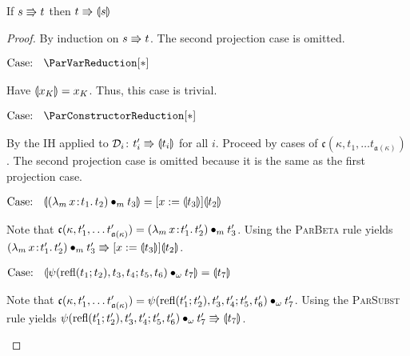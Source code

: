\begin{lemma}
    If $s \Rrightarrow t$ then $t \Rrightarrow \llparenthesis {s} \rrparenthesis$
    \label{lem:a:par_triangle}
\end{lemma}
\begin{proof}
    By induction on $s \Rrightarrow t$.
    The second projection case is omitted.

    $\text{Case: }\begin{array}{c} \ParVarReduction[*] \end{array}$
    \begin{proofcase}
        Have $\llparenthesis {x_K} \rrparenthesis = x_K$.
        Thus, this case is trivial.
    \end{proofcase}

    $\text{Case: }\begin{array}{c} \ParConstructorReduction[*] \end{array}$
    \begin{proofcase}
        By the IH applied to $\mathcal{D}_{i}$: $t_i^\prime \Rrightarrow \llparenthesis {t_i} \rrparenthesis$ for all $i$.
        Proceed by cases of $\mathfrak{c}(\kappa, t_1, \ldots t_{\mathfrak{a}(\kappa)})$.
        The second projection case is omitted because it is the same as the first projection case.

        $\text{Case: }\begin{array}{c} \llparenthesis {({\lambda_m}\, x\! : \! t_1.\, t_2) \bullet_{m} t_3} \rrparenthesis = [x := \llparenthesis {t_3} \rrparenthesis]\llparenthesis {t_2} \rrparenthesis \end{array}$
        \begin{proofcase}
            Note that $\mathfrak{c}(\kappa, t_1^\prime, \ldots t^\prime_{\mathfrak{a}(\kappa)}) = ({\lambda_m}\, x\! : \! t_1^\prime.\, t_2^\prime) \bullet_{m} t_3^\prime$.
            Using the \textsc{ParBeta} rule yields $({\lambda_m}\, x\! : \! t_1^\prime.\, t_2^\prime) \bullet_{m} t_3^\prime \Rrightarrow [x := \llparenthesis {t_3} \rrparenthesis]\llparenthesis {t_2} \rrparenthesis$.
        \end{proofcase}

        $\text{Case: }\begin{array}{c} \llparenthesis {\psi(\text{refl}(t_1; t_2), t_3, t_4; t_5, t_6) \bullet_{\omega} t_7} \rrparenthesis = \llparenthesis {t_7} \rrparenthesis \end{array}$
        \begin{proofcase}
            Note that $\mathfrak{c}(\kappa, t_1^\prime, \ldots t^\prime_{\mathfrak{a}(\kappa)}) = \psi(\text{refl}(t_1^\prime; t_2^\prime), t_3^\prime, t_4^\prime; t_5^\prime, t_6^\prime) \bullet_{\omega} t_7^\prime$.
            Using the \textsc{ParSubst} rule yields $\psi(\text{refl}(t_1^\prime; t_2^\prime), t_3^\prime, t_4^\prime; t_5^\prime, t_6^\prime) \bullet_{\omega} t_7^\prime \Rrightarrow \llparenthesis {t_7} \rrparenthesis$.
        \end{proofcase}


\end{proofcase}
\end{proof}
